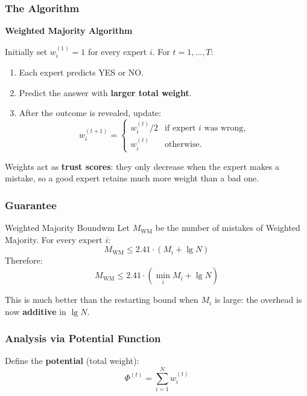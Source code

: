 \subsubsection{The Algorithm}

\begin{mdframed}[backgroundcolor=lightblue, linecolor=keyblue, linewidth=1pt]
\textbf{Weighted Majority Algorithm}

Initially set $w_i^{(1)} = 1$ for every expert $i$. For $t = 1, \ldots, T$:
\begin{enumerate}
  \item Each expert predicts YES or NO.
  \item Predict the answer with \textbf{larger total weight}.
  \item After the outcome is revealed, update:
    \[
      w_i^{(t+1)} = \begin{cases} w_i^{(t)} / 2 & \text{if expert } i \text{ was wrong,} \\ w_i^{(t)} & \text{otherwise.} \end{cases}
    \]
\end{enumerate}
\end{mdframed}

Weights act as \textbf{trust scores}: they only decrease when the expert makes a mistake, so a good expert retains much more weight than a bad one.

\subsubsection{Guarantee}

\begin{theorem}{Weighted Majority Bound}{wm}
Let $M_{\mathrm{WM}}$ be the number of mistakes of Weighted Majority. For every expert $i$:
\[
M_{\mathrm{WM}} \leq 2.41 \cdot (M_i + \lg N)
\]
Therefore:
\[
M_{\mathrm{WM}} \leq 2.41 \cdot \left(\min_i M_i + \lg N\right)
\]
\end{theorem}

This is much better than the restarting bound when $M_i$ is large: the overhead is now \textbf{additive} in $\lg N$.

\subsubsection{Analysis via Potential Function}

Define the \textbf{potential} (total weight):
\[
\Phi^{(t)} = \sum_{i=1}^{N} w_i^{(t)}
\]

